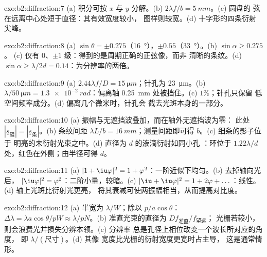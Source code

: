 \begin{solution}{exo:b2:diffraction:7}
(a) 积分可按 $x$ 与 $y$ 分解。(b) $2\lambda f/b = \qty{5}{mm}$。(c) 圆盘的
弦在远离中心处短于直径：其有效宽度较小，
图样则较宽。(d) 十字形的四条衍射
尖峰。
\end{solution}

\begin{solution}{exo:b2:diffraction:8}
(a) $\sin\theta = \pm0.275$（\qty{16}{\degree}），$\pm0.55$（\qty{33}{\degree}）。(b) $\sin\alpha \ge 0.275$。
(c) 仅有 $0$、$\pm1$ 级：得到的是周期正确的正弦像，而非
清晰的条纹。(d) $\sin\alpha \ge \lambda/2d = 0.14$：为分辨率的两倍。
\end{solution}

\begin{solution}{exo:b2:diffraction:9}
(a) $2.44\lambda f/D = \qty{15}{\micro m}$；针孔为 \qty{23}{\micro m}。(b) $\lambda/\qty{50}{\micro m} =
\qty{1.3e-2}{rad}$：偏离轴 \qty{0.25}{mm} 处被挡住。(c) $1\%$；针孔只保留
低空间频率成分。(d) 偏离几个微米时，针孔会
截去光斑本身的一部分。
\end{solution}

\begin{solution}{exo:b2:diffraction:10}
(a) 振幅与无遮挡波叠加，而在轴外无遮挡波为零：
此处 $|\underline s_{\text{缝}}| = |\underline s_{\text{条}}|$。(b) 条纹间距 $\lambda L/b =
\qty{16}{mm}$；测量间距即可得 $b$。(c) 细条的影子位于
明亮的未衍射光束之中。(d) 直径为 $d$ 的液滴衍射如同小孔
：环位于 $1.22\lambda/d$ 处，红色在外侧；由半径可得 $d$。
\end{solution}

\begin{solution}{exo:b2:diffraction:11}
(a) $|1 + \iu\varphi|^2 = 1 + \varphi^2$：一阶近似下均匀。(b) 去掉轴向光后，
$|\iu\varphi|^2 = \varphi^2$：二阶小量，较暗。(c) $|\iu + \iu\varphi|^2 =
1 + 2\varphi + \dots$：线性。(d) 轴上光斑比衍射光更亮，
将其衰减可使两振幅相当，从而提高对比度。
\end{solution}

\begin{solution}{exo:b2:diffraction:12}
(a) 半宽为 $\lambda/W$；除以 $p/a\cos\theta$：$\Delta\lambda = \lambda a\cos\theta/pW \approx
\lambda/pN$。(b) 准直光束的直径为 $Df_{\text{准直}}/f_{\text{望远}}$；
光栅若较小，则会浪费光并损失分辨本领。(c) 分辨率
总是孔径上相位改变一个波长所对应的角度，
即 $\lambda/(\text{尺寸})$。(d) 其像
宽度比光栅的衍射宽度更宽时占主导，
这是通常情形。
\end{solution}

